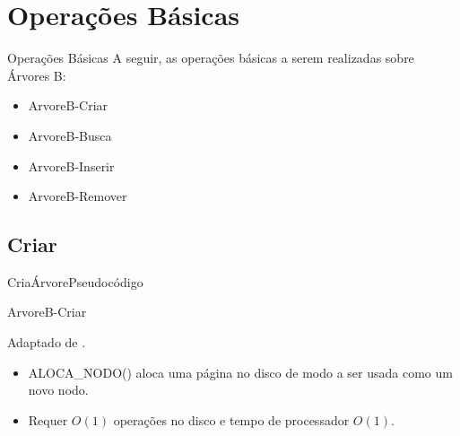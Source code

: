 \documentclass[aspectratio=169]{beamer}
\begin{document}
\section{Operações Básicas}

\begin{frame}{Operações Básicas}
A seguir, as operações básicas a serem realizadas sobre Árvores B:
 \begin{itemize}
 \item ArvoreB-Criar
 \item ArvoreB-Busca
 \item ArvoreB-Inserir
 \item ArvoreB-Remover
\end{itemize}
\end{frame}

\subsection{Criar}

\begin{frame}{CriaÁrvore}{Pseudocódigo}
\begin{algorithm}[H]
\caption{ArvoreB-Criar} 
\label{B-Tree-Create}
\end{algorithm}
\tiny{Adaptado de \cite{Cormen2012}.}
\begin{itemize}
 \item ALOCA\_NODO() aloca uma página no disco de modo a ser usada como um novo nodo.
 \item Requer $O(1)$ operações no disco e tempo de processador $O(1)$.
\end{itemize}
\end{frame}

\end{document}

